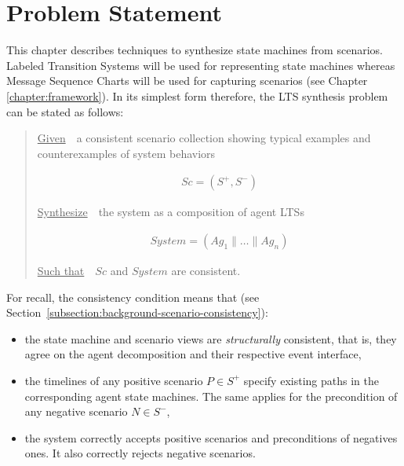 \section{Problem Statement\label{section:inductive-problem-statement}}

This chapter describes techniques to synthesize state machines from scenarios. Labeled Transition Systems will be used for representing state machines whereas Message Sequence Charts will be used for capturing scenarios (see Chapter \ref{chapter:framework}). In its simplest form therefore, the LTS synthesis problem can be stated as follows:

\begin{quotation}
\noindent \underline{Given}~~a consistent scenario collection showing typical examples and counterexamples of system behaviors

\vspace{-0.7cm}
\begin{align*}
Sc = (S^+,S^-)
\end{align*}

\vspace{-0.2cm}
\noindent \underline{Synthesize}~~the system as a composition of agent LTSs

\vspace{-0.7cm}
\begin{align*}
System = (Ag_1 \parallel \ldots \parallel Ag_n)
\end{align*}

\vspace{-0.2cm}
\noindent \underline{Such that}~~$Sc$ and $System$ are consistent.
\end{quotation}

\noindent For recall, the consistency condition means that (see Section~\ref{subsection:background-scenario-consistency}):

\begin{itemize}
\item the state machine and scenario views are \emph{structurally} consistent, that is, they agree on the agent decomposition and their respective event interface,
\item the timelines of any positive scenario $P \in S^+$ specify existing paths in the corresponding agent state machines. The same applies for the precondition of any negative scenario $N \in S^-$,
\item the system correctly accepts positive scenarios and preconditions of negatives ones. It also correctly rejects negative scenarios.
\end{itemize}



